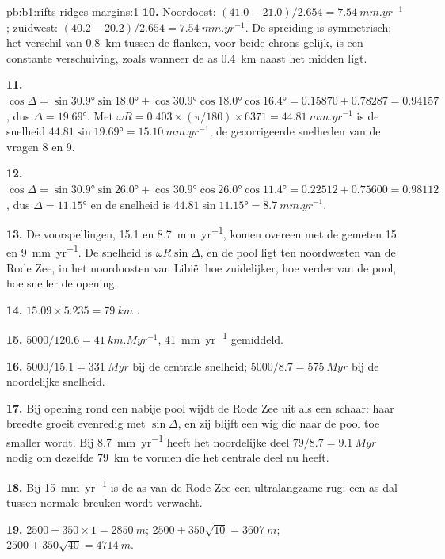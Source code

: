\begin{solution}{pb:b1:rifts-ridges-margins:1}
\textbf{10.} Noordoost: $(41.0 - 21.0)/2.654 = \qty{7.54}{mm.yr^{-1}}$; zuidwest:
$(40.2 - 20.2)/2.654 = \qty{7.54}{mm.yr^{-1}}$. De spreiding is symmetrisch; het
verschil van \qty{0.8}{km} tussen de flanken, voor beide chrons gelijk, is een
constante verschuiving, zoals wanneer de as \qty{0.4}{km} naast het midden ligt.

\textbf{11.} $\cos\Delta = \sin\ang{30.9}\sin\ang{18.0} +
\cos\ang{30.9}\cos\ang{18.0}\cos\ang{16.4} = 0.15870 + 0.78287 = 0.94157$, dus
$\Delta = \ang{19.69}$. Met $\omega R = 0.403\times(\pi/180)\times6371 =
\qty{44.81}{mm.yr^{-1}}$ is de snelheid $44.81\sin\ang{19.69} =
\qty{15.10}{mm.yr^{-1}}$, de gecorrigeerde snelheden van de vragen 8 en 9.

\textbf{12.} $\cos\Delta = \sin\ang{30.9}\sin\ang{26.0} +
\cos\ang{30.9}\cos\ang{26.0}\cos\ang{11.4} = 0.22512 + 0.75600 = 0.98112$, dus
$\Delta = \ang{11.15}$ en de snelheid is $44.81\sin\ang{11.15} =
\qty{8.7}{mm.yr^{-1}}$.

\textbf{13.} De voorspellingen, 15.1 en \qty{8.7}{mm.yr^{-1}}, komen overeen met
de gemeten 15 en \qty{9}{mm.yr^{-1}}. De snelheid is $\omega R\sin\Delta$, en de
pool ligt ten noordwesten van de Rode Zee, in het noordoosten van Libië: hoe
zuidelijker, hoe verder van de pool, hoe sneller de opening.

\textbf{14.} $15.09\times5.235 = \qty{79}{km}$ .

\textbf{15.} $5000/120.6 = \qty{41}{km.Myr^{-1}}$, \qty{41}{mm.yr^{-1}} gemiddeld.

\textbf{16.} $5000/15.1 = \qty{331}{Myr}$ bij de centrale snelheid;
$5000/8.7 = \qty{575}{Myr}$ bij de noordelijke snelheid.

\textbf{17.} Bij opening rond een nabije pool wijdt de Rode Zee uit als een
schaar: haar breedte groeit evenredig met $\sin\Delta$, en zij blijft een wig
die naar de pool toe smaller wordt. Bij \qty{8.7}{mm.yr^{-1}} heeft het
noordelijke deel $79/8.7 = \qty{9.1}{Myr}$ nodig om dezelfde \qty{79}{km}
 te vormen die het centrale deel nu heeft.

\textbf{18.} Bij \qty{15}{mm.yr^{-1}} is de as van de Rode Zee een ultralangzame
rug; een as-dal tussen normale breuken wordt verwacht.

\textbf{19.} $2500 + 350\times1 = \qty{2850}{m}$;
$2500 + 350\sqrt{10} = \qty{3607}{m}$; $2500 + 350\sqrt{40} = \qty{4714}{m}$.


\end{solution}
